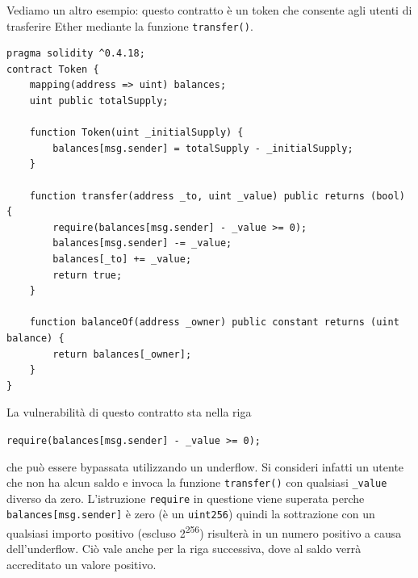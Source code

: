 Vediamo un altro esempio: questo contratto è un token che consente agli utenti di trasferire Ether mediante la funzione \texttt{transfer()}.
\begin{lstlisting}[language=Solidity]
pragma solidity ^0.4.18;
contract Token {
    mapping(address => uint) balances;
    uint public totalSupply;
    
    function Token(uint _initialSupply) {
        balances[msg.sender] = totalSupply - _initialSupply;
    }
    
    function transfer(address _to, uint _value) public returns (bool) {
        require(balances[msg.sender] - _value >= 0);
        balances[msg.sender] -= _value;
        balances[_to] += _value;
        return true;
    }
    
    function balanceOf(address _owner) public constant returns (uint balance) {
        return balances[_owner];
    }
}
\end{lstlisting}
La vulnerabilità di questo contratto sta nella riga

\texttt{require(balances[msg.sender] - \_value >= 0);}

che può essere bypassata utilizzando un underflow. Si consideri infatti un utente che non ha alcun saldo e invoca la funzione \texttt{transfer()} con qualsiasi \texttt{\_value} diverso da zero. L'istruzione \texttt{require} in questione viene superata perche \texttt{balances[msg.sender]} è zero (è un \texttt{uint256}) quindi la sottrazione con un qualsiasi importo positivo (escluso 2\textsuperscript{256}) risulterà in un numero positivo a causa dell'underflow. Ciò vale anche per la riga successiva, dove al saldo verrà accreditato un valore positivo.

